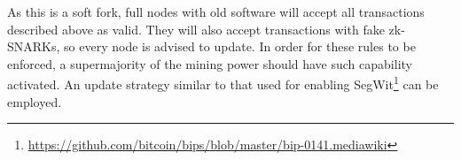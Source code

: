   As this is a soft fork, full nodes with old software will accept all
  transactions described above as valid. They will also accept transactions with
  fake zk-SNARKs, so every node is advised to update. In order for these rules
  to be enforced, a supermajority of the mining power should have such
  capability activated. An update strategy similar to that used for enabling
  SegWit\footnote{\url{https://github.com/bitcoin/bips/blob/master/bip-0141.mediawiki}}
  can be employed.
